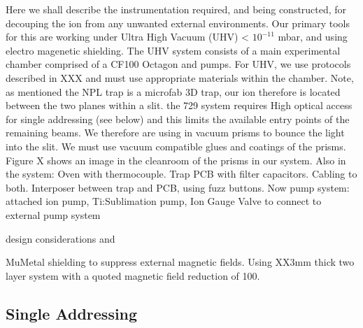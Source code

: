 \documentclass[12pt]{iopart}
\begin{document}
Here we shall describe the instrumentation required, and being
constructed, for decouping the ion from any unwanted external
environments. Our primary tools for this are working under Ultra High
Vacuum (UHV) < $10^{-11}$ mbar, and using electro magenetic
shielding. The UHV system consists of a main experimental chamber
comprised of a CF100 Octagon and pumps. For UHV, we use protocols
described in XXX and must use appropriate materials within the
chamber. Note, as mentioned the NPL trap is a microfab 3D trap, our
ion therefore is located between the two planes within a slit. the 729
system requires High optical access for single addressing (see below)
and this limits the available entry points of the remaining beams. We
therefore are using in vacuum prisms to bounce the light into the
slit. We must use vacuum compatible glues and coatings of the
prisms. Figure X shows an image in the cleanroom of the prisms in our
system.
Also in the system:
Oven with thermocouple.
Trap PCB with filter capacitors.
Cabling to both.
Interposer between trap and PCB, using fuzz buttons.
Now pump system:
attached ion pump,
Ti:Sublimation pump,
Ion Gauge
Valve to connect to external pump system

design considerations and 

MuMetal shielding to suppress external magnetic fields. Using XX3mm
thick two layer system with a quoted magnetic field reduction of 100.


\subsection{Single Addressing}
\end{document}

